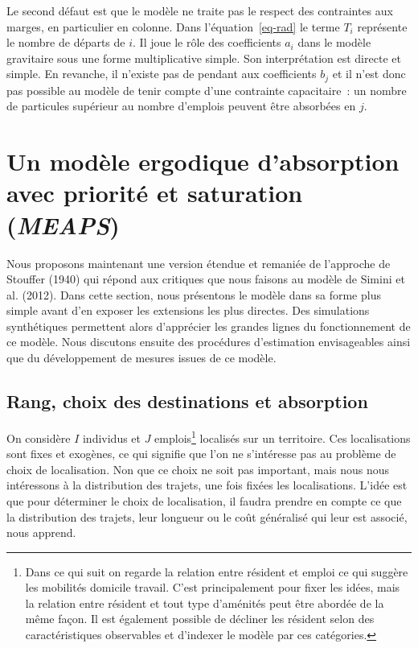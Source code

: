 \documentclass[
  10pt,
  a4paper,
  numbers=noendperiod,
  DIV=9]{scrreprt}
\begin{document}
Le second défaut est que le modèle ne traite pas le respect des
contraintes aux marges, en particulier en colonne. Dans
l'équation~\ref{eq-rad} le terme \(T_i\) représente le nombre de départs
de \(i\). Il joue le rôle des coefficients \(a_i\) dans le modèle
gravitaire sous une forme multiplicative simple. Son interprétation est
directe et simple. En revanche, il n'existe pas de pendant aux
coefficients \(b_j\) et il n'est donc pas possible au modèle de tenir
compte d'une contrainte capacitaire~: un nombre de particules supérieur
au nombre d'emplois peuvent être absorbées en \(j\).

\hypertarget{sec-meaps}{%
\section{\texorpdfstring{Un modèle ergodique d'absorption avec priorité
et saturation
(\emph{MEAPS})}{Un modèle ergodique d'absorption avec priorité et saturation (MEAPS)}}\label{sec-meaps}}

Nous proposons maintenant une version étendue et remaniée de l'approche
de Stouffer (1940) qui répond aux critiques que nous faisons au modèle
de Simini et al. (2012). Dans cette section, nous présentons le modèle
dans sa forme plus simple avant d'en exposer les extensions les plus
directes. Des simulations synthétiques permettent alors d'apprécier les
grandes lignes du fonctionnement de ce modèle. Nous discutons ensuite
des procédures d'estimation envisageables ainsi que du développement de
mesures issues de ce modèle.

\hypertarget{rang-choix-des-destinations-et-absorption}{%
\subsection{Rang, choix des destinations et
absorption}\label{rang-choix-des-destinations-et-absorption}}

On considère \(I\) individus et \(J\) emplois\footnote{Dans ce qui suit
  on regarde la relation entre résident et emploi ce qui suggère les
  mobilités domicile travail. C'est principalement pour fixer les idées,
  mais la relation entre résident et tout type d'aménités peut être
  abordée de la même façon. Il est également possible de décliner les
  résident selon des caractéristiques observables et d'indexer le modèle
  par ces catégories.} localisés sur un territoire. Ces localisations
sont fixes et exogènes, ce qui signifie que l'on ne s'intéresse pas au
problème de choix de localisation. Non que ce choix ne soit pas
important, mais nous nous intéressons à la distribution des trajets, une
fois fixées les localisations. L'idée est que pour déterminer le choix
de localisation, il faudra prendre en compte ce que la distribution des
trajets, leur longueur ou le coût généralisé qui leur est associé, nous
apprend.
\end{document}
